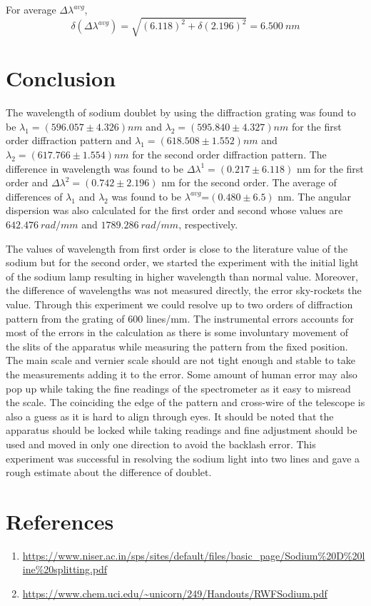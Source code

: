 \documentclass[a4paper, amsfonts, amssymb, amsmath, reprint, showkeys, nofootinbib, twoside]{revtex4-1}
\begin{document}
For average $\Delta \lambda^{avg}$,
\begin{equation}
		\delta(\Delta \lambda^{avg})=\sqrt{(6.118)^2+\delta(2.196)^2}=6.500~nm
\end{equation}

\section{Conclusion}
The wavelength of sodium doublet by using the diffraction grating was found to be $\lambda_1=(596.057\pm4.326) nm $ and $\lambda_2=(595.840\pm4.327) nm $ for the first order diffraction pattern and  $\lambda_1=(618.508\pm1.552) nm $ and $\lambda_2=(617.766\pm1.554) nm $ for the second order diffraction pattern. The difference in wavelength was found to be  $\Delta \lambda^1=(0.217\pm6.118)$ nm for the first order and $\Delta \lambda^2=(0.742\pm2.196)$ nm for the second order. The average of differences of $\lambda_1$ and $\lambda_2$ was found to be $\lambda^{avg}$=$(0.480\pm6.5)$ nm. The angular dispersion was also calculated for the first order and second whose values are $642.476 ~rad / mm$ and $1789.286 ~rad / mm$, respectively. 

The values of wavelength from first order is close to the literature value of the sodium but for the second order, we started the experiment with the initial light of the sodium lamp resulting in higher wavelength than normal value. Moreover, the difference of wavelengths was not measured directly, the error sky-rockets the value. Through this experiment we could resolve up to two orders of diffraction pattern from the grating of 600 lines/mm. The instrumental errors accounts for most of the errors in the calculation as there is some involuntary movement of the slits of the apparatus while measuring the pattern from the fixed position. The main scale and vernier scale should are not tight enough and stable to take the measurements adding it to the error. Some amount of human error may also pop up while taking the fine readings of the spectrometer as it easy to misread the scale. The coinciding the edge of the pattern  and cross-wire of the telescope is also a guess as it is hard to align through eyes. It should be noted that the apparatus should be locked while taking readings and fine adjustment should be used and moved in only one direction to avoid the backlash error.  This experiment was successful in resolving the sodium light into two lines and gave a rough estimate about the difference of doublet.

\section{References}
\begin{enumerate}
\item{\url{https://www.niser.ac.in/sps/sites/default/files/basic_page/Sodium%20D%20line%20splitting.pdf}}
\item{\url{https://www.chem.uci.edu/~unicorn/249/Handouts/RWFSodium.pdf}}
\end{enumerate}
\end{document}
